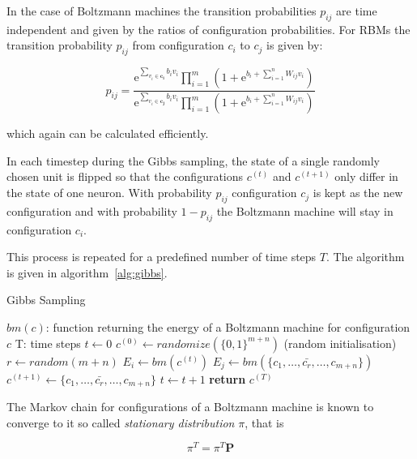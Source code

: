 In the case of Boltzmann machines the transition probabilities $p_{ij}$ are time independent and 
given by the ratios of configuration probabilities. For RBMs the transition probability $p_{ij}$ 
from configuration $c_i$ to $c_j$ is given by:

\begin{equation}
    p_{ij} = \frac{\mathrm{e}^{\sum_{v_i \in \bm{c_i}}b_iv_i}\prod_{i=1}^m(1+\mathrm{e}^{b_i + \sum_{i=1}^nW_{ij}v_i})}{\mathrm{e}^{\sum_{v_i \in \bm{c_j}}b_iv_i}\prod_{i=1}^m(1+\mathrm{e}^{b_i + \sum_{i=1}^nW_{ij}v_i})}
\end{equation}

which again can be calculated efficiently.

In each timestep during the Gibbs sampling, the state of a single randomly chosen unit is flipped
so that the configurations $c^{(t)}$ and $c^{(t+1)}$ only differ in the state of one neuron. With 
probability $p_{ij}$ configuration $c_j$ is kept as the new configuration and with probability
$1-p_{ij}$ the Boltzmann machine will stay in configuration $c_i$.

This process is repeated for a predefined number of time steps $T$. The algorithm is given in 
algorithm~\ref{alg:gibbs}.

\begin{algorithm}[H]
    \label{alg:gibbs}
    \caption{Gibbs Sampling}\label{euclid}
    \begin{algorithmic}[1]
        \Require $bm(c)$: function returning the energy of a Boltzmann machine for configuration $c$
        \Require T: time steps
        \State $t\gets 0$
        \State $c^{(0)} \gets randomize(\{0,1\}^{m+n})$ (random initialisation)
        \Repeat
            \State $r \gets random(m+n)$
            \State $E_i \gets bm(c^{(t)})$
            \State $E_j \gets bm(\{c_1,\dots,\bar{c_r},\dots,c_{m+n}\})$
                \State $c^{(t+1)} \gets \{c_1,\dots,\bar{c_r},\dots,c_{m+n}\}$
            \EndIf
            \State $t\gets t+1$
        \State \textbf{return} $c^{(T)}$
    \end{algorithmic}
\end{algorithm}

The Markov chain for configurations of a Boltzmann machine is known to converge to it so called 
\textit{stationary distribution} $\pi$, that is

\begin{equation}
    \pi^T=\pi^T\bm{P}
\end{equation}

